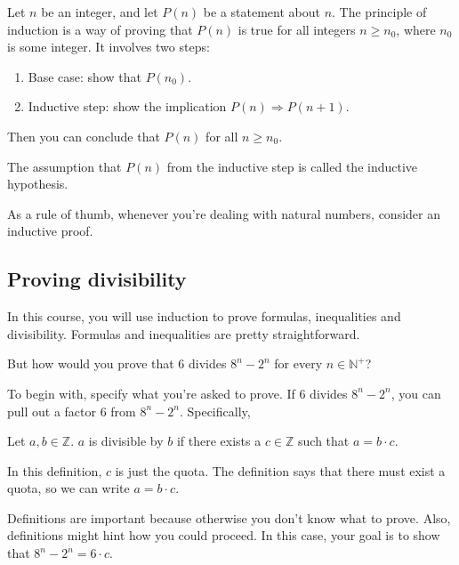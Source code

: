 \documentclass{scrreprt}
\begin{document}
\begin{theorem}
    Let $n$ be an integer, and let $P(n)$ be a statement about $n$. The principle of induction is a way of proving that $P(n)$ is true for all integers $n \geq n_0$, where $n_0$ is some integer. It involves two steps:
    \begin{enumerate}
        \item Base case: show that $P(n_0)$.
        \item Inductive step: show the implication $P(n) \Rightarrow P(n + 1)$.
    \end{enumerate}
    Then you can conclude that $P(n)$ for all $n \geq n_0$.
\end{theorem}
The assumption that $P(n)$ from the inductive step is called the inductive hypothesis.

As a rule of thumb, whenever you're dealing with natural numbers, consider an inductive proof.

\subsection*{Proving divisibility}
In this course, you will use induction to prove formulas, inequalities and divisibility. Formulas and inequalities are pretty straightforward.

But how would you prove that $6$ divides $8^n - 2^n$ for every $n \in \mathbb{N}^+$?

To begin with, specify what you're asked to prove. If $6$ divides $8^n - 2^n$, you can pull out a factor $6$ from $8^n - 2^n$. Specifically,
\begin{definition}
    Let $a, b \in \mathbb{Z}$. $a$ is divisible by $b$ if there exists a $c \in \mathbb{Z}$ such that $a = b \cdot c$.
\end{definition}
In this definition, $c$ is just the quota. The definition says that there must exist a quota, so we can write $a = b \cdot c$.

Definitions are important because otherwise you don't know what to prove. Also, definitions might hint how you could proceed. In this case, your goal is to show that $8^n - 2^n = 6 \cdot c$.
\end{document}
